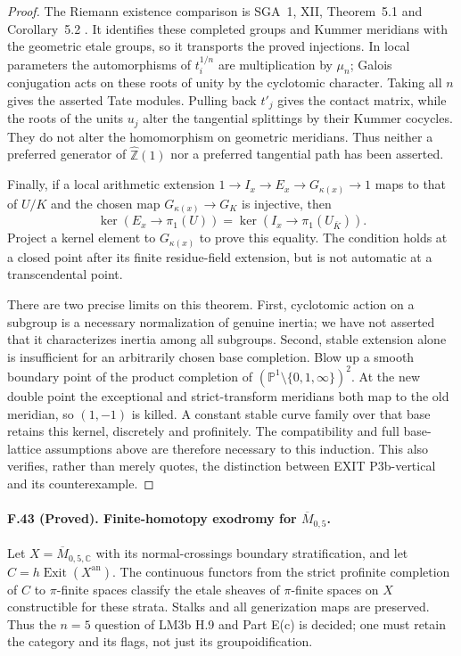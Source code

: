 \begin{proof}
The Riemann existence comparison is SGA~1, XII, Theorem~5.1 and
Corollary~5.2 \cite{SGA1}. It identifies these completed groups and
Kummer meridians with the geometric etale groups, so it transports
the proved injections. In local parameters the automorphisms of
$t_i^{1/n}$ are multiplication by $\mu_n$; Galois conjugation acts on
these roots of unity by the cyclotomic character. Taking all $n$
gives the asserted Tate modules. Pulling back $t'_j$ gives the contact
matrix, while the roots of the units $u_j$ alter the tangential
splittings by their Kummer cocycles. They do not alter the homomorphism
on geometric meridians. Thus neither a preferred generator of
$\widehat{\mathbb Z}(1)$ nor a preferred tangential path has been
asserted.

Finally, if a local arithmetic extension
$1\to I_x\to E_x\to G_{\kappa(x)}\to1$ maps to that of $U/K$ and the
chosen map $G_{\kappa(x)}\to G_K$ is injective, then
\[
 \ker(E_x\to\pi_1(U))=
 \ker(I_x\to\pi_1(U_{\bar K})).
\]
Project a kernel element to $G_{\kappa(x)}$ to prove this equality.
The condition holds at a closed point after its finite residue-field
extension, but is not automatic at a transcendental point.

There are two precise limits on this theorem. First, cyclotomic action
on a subgroup is a necessary normalization of genuine inertia; we have
not asserted that it characterizes inertia among all subgroups.
Second, stable extension alone is insufficient for an arbitrarily
chosen base completion. Blow up a smooth boundary point of the product
completion of $(\mathbb P^1\setminus\{0,1,\infty\})^2$. At the new
double point the exceptional and strict-transform meridians both map
to the old meridian, so $(1,-1)$ is killed. A constant stable curve
family over that base retains this kernel, discretely and profinitely.
The compatibility and full base-lattice assumptions above are therefore
necessary to this induction. This also verifies, rather than merely
quotes, the distinction between EXIT P3b-vertical and its counterexample.
\end{proof}

\paragraph{F.43 (Proved). Finite-homotopy exodromy for $\overline M_{0,5}$.}
Let $X=\overline M_{0,5,\mathbb C}$ with its normal-crossings boundary
stratification, and let $C=h\operatorname{Exit}(X^{\mathrm{an}})$.
The continuous functors from the strict profinite completion of $C$ to
$\pi$-finite spaces classify the etale sheaves of $\pi$-finite spaces on
$X$ constructible for these strata. Stalks and all generization maps are
preserved. Thus the $n=5$ question of LM3b H.9 and Part E(c) is decided;
one must retain the category and its flags, not just its groupoidification.

